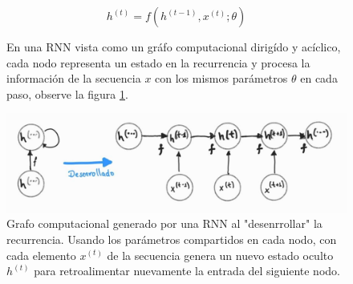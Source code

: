 \begin{equation}
    h^{(t)} = f(h^{(t-1)}, x^{(t)}; \theta)
\end{equation}
\label{eq:rnn}
\begin{figure}[]

En una RNN vista como un gráfo computacional dirigído y acíclico, cada nodo representa un estado en
la recurrencia y procesa la información de la secuencia $x$ con los mismos parámetros $\theta$ en cada
paso, observe la figura \ref{fig:rnn_cg}.

\centering

\includegraphics[width=.8\textwidth]{Chapters/1. Transformer/Figures/rnn/rnn_cgraph.jpg}

\caption[RNN - Grafo Computacional]{Grafo computacional generado por una RNN al "desenrrollar" la
recurrencia. Usando los parámetros compartidos en cada nodo, con cada elemento $x^{(t)}$ de la
secuencia genera un nuevo estado oculto $h^{(t)}$ para retroalimentar nuevamente la entrada del
siguiente nodo.}

\label{fig:rnn_cg}
\end{figure}


